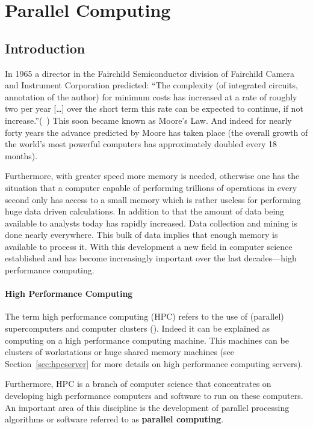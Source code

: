 \chapter{Parallel Computing}
\label{chap:parallelcomputing}
\section{Introduction}
\label{sec:parallelintro}
In 1965 a director in the Fairchild Semiconductor division of
Fairchild Camera and Instrument Corporation predicted: ``The complexity
(of integrated circuits, annotation of the author)
for minimum costs has increased at a rate of roughly two per year
[\ldots] over the short term this rate can be expected to continue, if
not increase.''(~\cite{moore65integratedcircuits}) This soon became known
as Moore's Law. And 
indeed for nearly forty years the advance predicted by Moore has
taken place (the overall growth of the world's most powerful computers
has approximately doubled every 18 months).

Furthermore, with greater speed more memory is needed, otherwise one has
the situation that a computer capable of performing trillions of
operations in every second only has access to a small memory which is
rather useless for performing huge data driven calculations. In addition to
that the amount of data being available to analysts today has rapidly
increased. Data collection and mining is done nearly everywhere. This
bulk of data implies that enough memory is available to process
it. With this development a new field in computer science established
and has become increasingly important over the last decades---high
performance computing.

\subsubsection{High Performance Computing}

The term high performance computing (HPC) refers to the use of (parallel)
supercomputers and computer clusters (\cite{wiki:hpc}). Indeed it can
be explained as computing on a high performance computing
machine. This machines can be clusters of workstations or huge shared
memory machines (see Section~\ref{sec:hpcserver} for more details on
high performance computing servers).

Furthermore, HPC is a branch of computer science that concentrates on
developing high performance computers and software to run on these
computers. An important area of this discipline is the development of
parallel processing algorithms or software referred to as
\textbf{parallel computing}.
 
